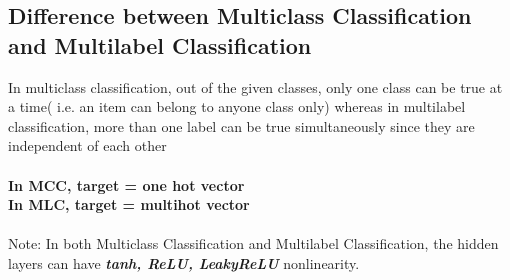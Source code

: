 \documentclass[11pt]{article}
\begin{document}
\subsection{Difference between Multiclass Classification and Multilabel Classification}
In multiclass classification, out of the given classes, only one class can be true at a time( i.e. an item can belong to anyone class only) whereas in multilabel classification, more than one label can be true simultaneously since they are independent of each other\\\\
{\bf In MCC, target = one hot vector\\
In MLC, target = multihot vector\\\\}
Note: In both Multiclass Classification and Multilabel Classification, the hidden layers can have \textit{\bf tanh, ReLU, LeakyReLU} nonlinearity.
\newpage
\end{document}
